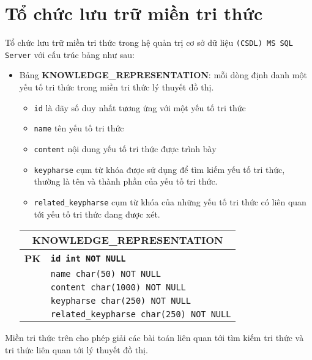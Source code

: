 \section{Tổ chức lưu trữ miền tri thức} 

Tổ chức lưu trữ miền tri thức trong hệ quản trị cơ sở dữ liệu \texttt{(CSDL) MS SQL Server} với cấu trúc bảng như sau:

\begin{itemize}
	\item Bảng \textbf{\textbf{KNOWLEDGE\_REPRESENTATION}}: mỗi dòng định danh một yếu tố tri thức trong miền tri thức lý thuyết đồ thị. 
	\begin{itemize}
		\item \texttt{id} là dãy số duy nhất tương ứng với một yếu tố tri thức 
		\item \texttt{name} tên yếu tố tri thức
		\item \texttt{content} nội dung yếu tố tri thức được trình bày
		\item \texttt{keypharse} cụm từ khóa được sử dụng để tìm kiếm yếu tố tri thức, thường là tên và thành phần của yếu tố tri thức.
		\item \texttt{related\_keypharse} cụm từ khóa của những yếu tố tri thức có liên quan tới yếu tố tri thức đang được xét.
	\end{itemize} 
	
	\begin{tabular}{|c|l|}
		\hline
		\multicolumn{2}{|c|}{\textbf{KNOWLEDGE\_REPRESENTATION}} \\
		\hline
		\textbf{PK} & \texttt{\textbf{id int NOT NULL}} \\
		\hline
		& \texttt{name char(50) NOT NULL} \\
		\hline
		& \texttt{content char(1000) NOT NULL} \\
		\hline
		& \texttt{keypharse char(250) NOT NULL} \\
		\hline
		& \texttt{related\_keypharse char(250) NOT NULL} \\
		\hline
	\end{tabular}
	
\end{itemize}

Miền tri thức trên cho phép giải các bài toán liên quan tới tìm kiếm tri thức và tri thức liên quan tới lý thuyết đồ thị.

